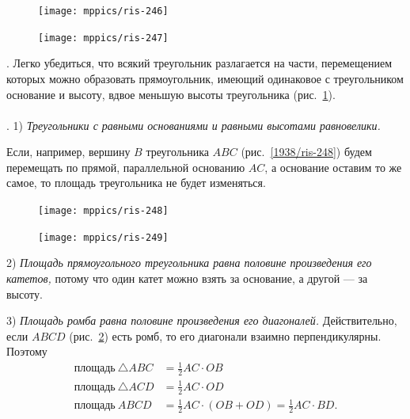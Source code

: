 \documentclass[oneside]{book}
\begin{document}
\begin{figure}[h]
\begin{minipage}{.48\textwidth}
\centering
\texttt{[image: mppics/ris-246]}
\caption{}\label{1938/ris-246}
\end{minipage}
\hfill
\begin{minipage}{.48\textwidth}
\centering
\texttt{[image: mppics/ris-247]}
\caption{}\label{1938/ris-247}
\end{minipage}
\end{figure}

\smallskip
\mbox{.}
Легко убедиться, что всякий треугольник разлагается на части, перемещением которых можно образовать прямоугольник, имеющий одинаковое с треугольником основание и высоту, вдвое меньшую высоты треугольника (рис.~\ref{1938/ris-247}).

\paragraph{}\label{1938/249}
.
1) \emph{Треугольники с равными основаниями и равными высотами равновелики.}

Если, например, вершину $B$ треугольника $ABC$ (рис.~\ref{1938/ris-248}) будем перемещать по прямой, параллельной основанию $AC$, а основание оставим то же самое, то площадь треугольника не будет изменяться.

\begin{figure}[h]
\begin{minipage}{.48\textwidth}
\centering
\texttt{[image: mppics/ris-248]}
\caption{}\label{1938/ris-248}
\end{minipage}
\hfill
\begin{minipage}{.48\textwidth}
\centering
\texttt{[image: mppics/ris-249]}
\caption{}\label{1938/ris-249}
\end{minipage}
\end{figure}


2) \emph{Площадь прямоугольного треугольника равна половине произведения его катетов,} потому что один катет можно взять за основание, а другой — за высоту.


3) \emph{Площадь ромба равна половине произведения его диагоналей.}
Действительно, если $ABCD$ (рис.~\ref{1938/ris-249}) есть ромб, то его диагонали взаимно перпендикулярны.
Поэтому
\begin{align*}
\text{площадь}~\triangle ABC&=\tfrac12AC\cdot  OB
\\
\text{площадь}~\triangle ACD&=\tfrac12AC\cdot  OD
\\ %
\text{площадь}~ABCD&=\tfrac12AC\cdot (OB+OD)=\tfrac12AC\cdot BD.
\end{align*}
\end{document}
